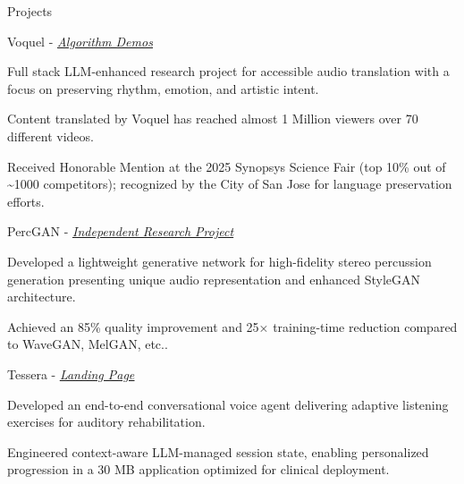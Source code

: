 \documentclass[
  10pt, %
]{resume}
\begin{document}
\begin{rSection}{Projects}

  
    \begin{rSubsection}{Voquel - \textit{\underline{\href{https://www.youtube.com/@translateanyaudio}{Algorithm Demos}}}}{}{}{}
        
      \item Full stack LLM-enhanced research project for accessible audio translation with a focus on preserving rhythm, emotion, and artistic intent.
          
      \item Content translated by Voquel has reached almost 1 Million viewers over 70 different videos.
          
      \item Received Honorable Mention at the 2025 Synopsys Science Fair (top 10\% out of \textasciitilde{}1000 competitors); recognized by the City of San Jose for language preservation efforts.
          
    \end{rSubsection}
        
    \begin{rSubsection}{PercGAN - \textit{\underline{\href{https://github.com/shuklabhay/percgan}{Independent Research Project}}}}{}{}{}
        
      \item Developed a lightweight generative network for high-fidelity stereo percussion generation presenting unique audio representation and enhanced StyleGAN architecture.
          
      \item Achieved an 85\% quality improvement and 25× training-time reduction compared to WaveGAN, MelGAN, etc..
          
    \end{rSubsection}
        
    \begin{rSubsection}{Tessera - \textit{\underline{\href{https://shuklabhay.github.io/tessera/}{Landing Page}}}}{}{}{}
        
      \item Developed an end-to-end conversational voice agent delivering adaptive listening exercises for auditory rehabilitation.
          
      \item Engineered context-aware LLM-managed session state, enabling personalized progression in a 30 MB application optimized for clinical deployment.
          

\end{rSubsection}
\end{rSection}
\end{document}
